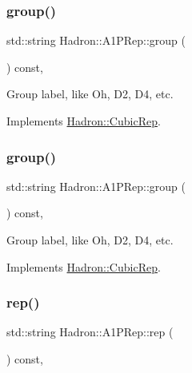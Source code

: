 \subsubsection{\texorpdfstring{group()}{group()}\hspace{0.1cm}{\footnotesize\ttfamily [1/2]}}
{\footnotesize\ttfamily std\+::string Hadron\+::\+A1\+P\+Rep\+::group (\begin{DoxyParamCaption}{ }\end{DoxyParamCaption}) const\hspace{0.3cm}{\ttfamily [inline]}, {\ttfamily [virtual]}}

Group label, like Oh, D2, D4, etc. 

Implements \mbox{\hyperlink{structHadron_1_1CubicRep_a0748f11ec87f387062c8e8981339a29c}{Hadron\+::\+Cubic\+Rep}}.

\mbox{\label{structHadron_1_1A1PRep_a62ee0e58d7e0763955b3c738cbcfdd4d}} 
\subsubsection{\texorpdfstring{group()}{group()}\hspace{0.1cm}{\footnotesize\ttfamily [2/2]}}
{\footnotesize\ttfamily std\+::string Hadron\+::\+A1\+P\+Rep\+::group (\begin{DoxyParamCaption}{ }\end{DoxyParamCaption}) const\hspace{0.3cm}{\ttfamily [inline]}, {\ttfamily [virtual]}}

Group label, like Oh, D2, D4, etc. 

Implements \mbox{\hyperlink{structHadron_1_1CubicRep_a0748f11ec87f387062c8e8981339a29c}{Hadron\+::\+Cubic\+Rep}}.

\mbox{\label{structHadron_1_1A1PRep_a8bacecde30050e482f468346bb51da28}} 
\subsubsection{\texorpdfstring{rep()}{rep()}\hspace{0.1cm}{\footnotesize\ttfamily [1/2]}}
{\footnotesize\ttfamily std\+::string Hadron\+::\+A1\+P\+Rep\+::rep (\begin{DoxyParamCaption}{ }\end{DoxyParamCaption}) const\hspace{0.3cm}{\ttfamily [inline]}, {\ttfamily [virtual]}}


